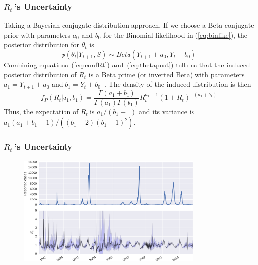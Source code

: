 \documentclass[10pt,compress,notheorems]{beamer}
\def \rr {$R_{t}\:$}
\begin{document}
\begin{frame}
\frametitle{\rr's Uncertainty}
Taking a Bayesian conjugate distribution approach, If we choose a
Beta conjugate prior with parameters $a_0$ and $b_0$ for the 
Binomial likelihood in (\ref{eq:binlike}), the posterior distribution for 
$\theta_t$ is
\begin{equation}
\label{eq:thetapost}
p(\theta_t| Y_{t+1}, S) \sim Beta(Y_{t+1} + a_0, Y_t + b_0)
\end{equation}
Combining equations~(\ref{eq:confRt}) and~(\ref{eq:thetapost}) 
tells us that the induced posterior distribution of $R_t$ is 
a Beta prime (or inverted Beta) with parameters $ a_1 = Y_{t+1} + a_0$ and $b_1 
=  Y_t + b_0$~\cite{dubey1970}.
The density of the induced distribution is then 
\begin{equation}
\label{eq:densityMantel}
f_P(R_t| a_1, b_1) = \frac{\Gamma(a_1 + b_1)}{\Gamma(a_1)\Gamma(b_1)} R_t^{a_1 
- 
1} (1 + R_t)^{-(a_1 + b_1)}
\end{equation}
Thus, the expectation of \rr is $a_1/(b_1 - 1)$ and its variance is 
$a_1(a_1 + b_1 - 1)/\left((b_1 - 2)(b_1 - 1)^2 \right) $.
\end{frame}



\begin{frame}
\frametitle{\rr's Uncertainty}
\begin{center}
\begin{figure}
  \includegraphics[width=9cm]{./rt_series.png}
\end{figure}
\end{center}
\end{frame}
\end{document}
